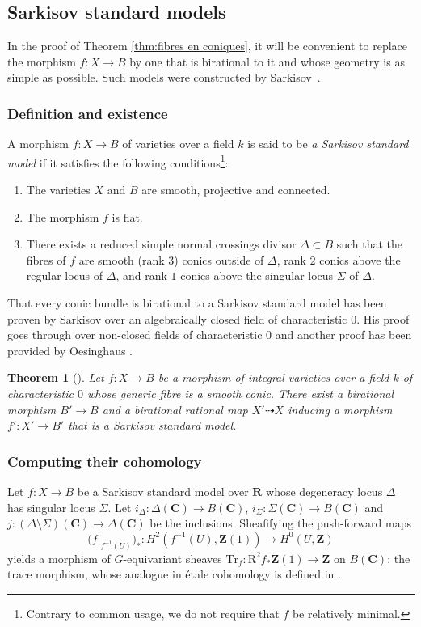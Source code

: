 \documentclass[JEP,XML,SOM,Unicode]{cedram}
\theoremstyle{plain}
\newtheorem{thm}{Theorem}[section]
\theoremstyle{definition}
\numberwithin{equation}{section}
\renewcommand{\C}{{\mathbf C}}
\newcommand{\R}{{\mathbf R}}
\newcommand{\Z}{{\mathbf Z}}
\newcommand{\Trf}{\mathrm{Tr}_f}
\newcommand{\RR}{{\mathrm{R}}}
\begin{document}
\subsection{Sarkisov standard models}

In the proof of Theorem \ref{thm:fibres en coniques}, it will be convenient to replace the morphism $f:X\to B$ by one that is birational to it and whose geometry is as simple as possible. Such models were constructed by Sarkisov~\cite{Sarkisov}.

\subsubsection{Definition and existence}
\label{subsubsec:def sarkisov}

A morphism $f:X\to B$ of varieties over a field $k$ is said to be \textit{a Sarkisov standard model} if it satisfies the following conditions\footnote{Contrary to common usage, we do not require that $f$ be relatively minimal.}:
\begin{enumerate}
\item The varieties $X$ and $B$ are smooth, projective and connected.
\item The morphism $f$ is flat.
\item There exists a reduced simple normal crossings divisor $\Delta\subset B$
such that the fibres of $f$ are smooth (rank $3$) conics outside of $\Delta$, rank $2$ conics above the regular locus of $\Delta$, and rank $1$ conics above the singular locus $\Sigma$ of $\Delta$.
\end{enumerate}

That every conic bundle is birational to a Sarkisov standard model has been proven by Sarkisov \cite[Prop.\,1.16]{Sarkisov} over an algebraically closed field of characteristic $0$. His proof goes through over
non-closed fields of characteristic $0$ and another proof has been provided by Oesinghaus \cite[Th.\,7]{Oesinghaus}.

\begin{thm}[\cite{Sarkisov, Oesinghaus}]
\label{thm:existenceSarkisov}
Let $f:X\to B$ be a morphism of integral varieties over a field $k$ of characteristic $0$ whose generic fibre is a smooth conic. There exist a birational morphism $B'\to B$ and a birational rational map $X'\dashrightarrow X$ inducing a morphism $f' : X'\to B'$ that is a Sarkisov standard model.
\end{thm}

\subsubsection{Computing their cohomology}
\label{subsub:cohoSarkisov}
Let $f:X\to B$ be a Sarkisov standard model over $\R$ whose degeneracy locus $\Delta$ has singular locus $\Sigma$.
Let $i_{\Delta}:\Delta(\C)\to B(\C)$, $i_{\Sigma}:\Sigma(\C)\to B(\C)$ and $j:(\Delta\setminus\Sigma)(\C)\to\Delta(\C)$ be the inclusions.
Sheafifying the push-forward maps
\[
\big(f|_{f^{-1}(U)}\big)_*:H^2(f^{-1}(U),\Z(1))\to H^0(U,\Z)
\]
yields a morphism of $G$-equivariant sheaves $\Trf:\RR^2f_*\Z(1)\to\Z$ on $B(\C)$: the trace morphism, whose analogue in étale cohomology is defined in \cite[Th.\,2.9]{delignedualite}.
\end{document}
